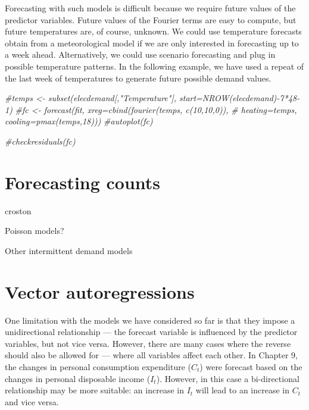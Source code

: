 \documentclass[]{book}
\newenvironment{Shaded}{\begin{snugshade}}{\end{snugshade}}
\newcommand{\CommentTok}[1]{\textcolor[rgb]{0.56,0.35,0.01}{\textit{#1}}}
\begin{document}
Forecasting with such models is difficult because we require future values of the predictor variables. Future values of the Fourier terms are easy to compute, but future temperatures are, of course, unknown. We could use temperature forecasts obtain from a meteorological model if we are only interested in forecasting up to a week ahead. Alternatively, we could use scenario forecasting and plug in possible temperature patterns. In the following example, we have used a repeat of the last week of temperatures to generate future possible demand values.

\begin{Shaded}
\begin{Highlighting}[]
\CommentTok{#temps <- subset(elecdemand[,"Temperature"], start=NROW(elecdemand)-7*48-1)}
\CommentTok{#fc <- forecast(fit, xreg=cbind(fourier(temps, c(10,10,0)),}
\CommentTok{#                           heating=temps, cooling=pmax(temps,18)))}
\CommentTok{#autoplot(fc)}
\end{Highlighting}
\end{Shaded}

\begin{Shaded}
\begin{Highlighting}[]
\CommentTok{#checkresiduals(fc)}
\end{Highlighting}
\end{Shaded}

\hypertarget{forecasting-counts}{%
\section{Forecasting counts}\label{forecasting-counts}}

croston

Poisson models?

Other intermittent demand models

\hypertarget{VAR}{%
\section{Vector autoregressions}\label{VAR}}

One limitation with the models we have considered so far is that they impose a unidirectional relationship --- the forecast variable is influenced by the predictor variables, but not vice versa. However, there are many cases where the reverse should also be allowed for --- where all variables affect each other. In Chapter 9, the changes in personal consumption expenditure (\(C_t\)) were forecast based on the changes in personal disposable income (\(I_t\)). However, in this case a bi-directional relationship may be more suitable: an increase in \(I_t\) will lead to an increase in \(C_t\) and vice versa.
\end{document}
